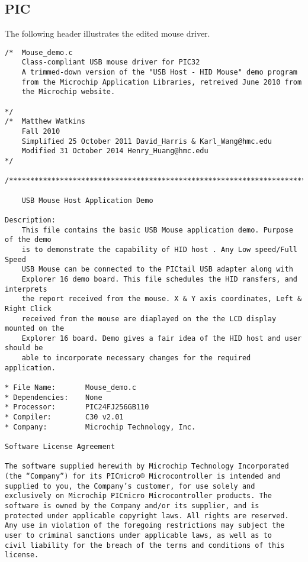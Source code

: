 \documentclass{article}
\begin{document}
\subsection{PIC}

The following header illustrates the edited mouse driver.

\begin{verbatim}
/*	Mouse_demo.c
	Class-compliant USB mouse driver for PIC32
	A trimmed-down version of the "USB Host - HID Mouse" demo program
	from the Microchip Application Libraries, retreived June 2010 from
	the Microchip website.
	
*/
/*  Matthew Watkins
	Fall 2010
  	Simplified 25 October 2011 David_Harris & Karl_Wang@hmc.edu
    Modified 31 October 2014 Henry_Huang@hmc.edu
*/

/******************************************************************************

    USB Mouse Host Application Demo

Description:
    This file contains the basic USB Mouse application demo. Purpose of the demo
    is to demonstrate the capability of HID host . Any Low speed/Full Speed
    USB Mouse can be connected to the PICtail USB adapter along with 
    Explorer 16 demo board. This file schedules the HID ransfers, and interprets
    the report received from the mouse. X & Y axis coordinates, Left & Right Click
    received from the mouse are diaplayed on the the LCD display mounted on the
    Explorer 16 board. Demo gives a fair idea of the HID host and user should be
    able to incorporate necessary changes for the required application.

* File Name:       Mouse_demo.c
* Dependencies:    None
* Processor:       PIC24FJ256GB110
* Compiler:        C30 v2.01
* Company:         Microchip Technology, Inc.

Software License Agreement

The software supplied herewith by Microchip Technology Incorporated
(the “Company”) for its PICmicro® Microcontroller is intended and
supplied to you, the Company’s customer, for use solely and
exclusively on Microchip PICmicro Microcontroller products. The
software is owned by the Company and/or its supplier, and is
protected under applicable copyright laws. All rights are reserved.
Any use in violation of the foregoing restrictions may subject the
user to criminal sanctions under applicable laws, as well as to
civil liability for the breach of the terms and conditions of this
license.


\end{verbatim}
\end{document}
